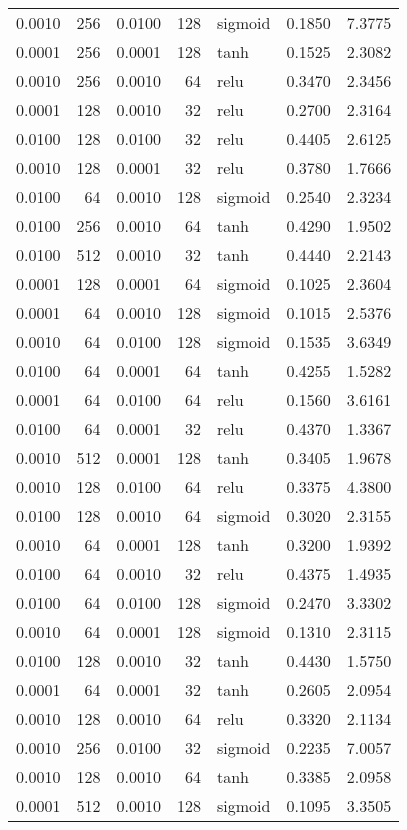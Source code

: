 \begin{table}
\begin{tabular}{rrrrlrr}
0.0010 & 256 & 0.0100 & 128 & sigmoid & 0.1850 & 7.3775 \\
0.0001 & 256 & 0.0001 & 128 & tanh & 0.1525 & 2.3082 \\
0.0010 & 256 & 0.0010 & 64 & relu & 0.3470 & 2.3456 \\
0.0001 & 128 & 0.0010 & 32 & relu & 0.2700 & 2.3164 \\
0.0100 & 128 & 0.0100 & 32 & relu & 0.4405 & 2.6125 \\
0.0010 & 128 & 0.0001 & 32 & relu & 0.3780 & 1.7666 \\
0.0100 & 64 & 0.0010 & 128 & sigmoid & 0.2540 & 2.3234 \\
0.0100 & 256 & 0.0010 & 64 & tanh & 0.4290 & 1.9502 \\
0.0100 & 512 & 0.0010 & 32 & tanh & 0.4440 & 2.2143 \\
0.0001 & 128 & 0.0001 & 64 & sigmoid & 0.1025 & 2.3604 \\
0.0001 & 64 & 0.0010 & 128 & sigmoid & 0.1015 & 2.5376 \\
0.0010 & 64 & 0.0100 & 128 & sigmoid & 0.1535 & 3.6349 \\
0.0100 & 64 & 0.0001 & 64 & tanh & 0.4255 & 1.5282 \\
0.0001 & 64 & 0.0100 & 64 & relu & 0.1560 & 3.6161 \\
0.0100 & 64 & 0.0001 & 32 & relu & 0.4370 & 1.3367 \\
0.0010 & 512 & 0.0001 & 128 & tanh & 0.3405 & 1.9678 \\
0.0010 & 128 & 0.0100 & 64 & relu & 0.3375 & 4.3800 \\
0.0100 & 128 & 0.0010 & 64 & sigmoid & 0.3020 & 2.3155 \\
0.0010 & 64 & 0.0001 & 128 & tanh & 0.3200 & 1.9392 \\
0.0100 & 64 & 0.0010 & 32 & relu & 0.4375 & 1.4935 \\
0.0100 & 64 & 0.0100 & 128 & sigmoid & 0.2470 & 3.3302 \\
0.0010 & 64 & 0.0001 & 128 & sigmoid & 0.1310 & 2.3115 \\
0.0100 & 128 & 0.0010 & 32 & tanh & 0.4430 & 1.5750 \\
0.0001 & 64 & 0.0001 & 32 & tanh & 0.2605 & 2.0954 \\
0.0010 & 128 & 0.0010 & 64 & relu & 0.3320 & 2.1134 \\
0.0010 & 256 & 0.0100 & 32 & sigmoid & 0.2235 & 7.0057 \\
0.0010 & 128 & 0.0010 & 64 & tanh & 0.3385 & 2.0958 \\
0.0001 & 512 & 0.0010 & 128 & sigmoid & 0.1095 & 3.3505 \\

\end{tabular}
\end{table}
